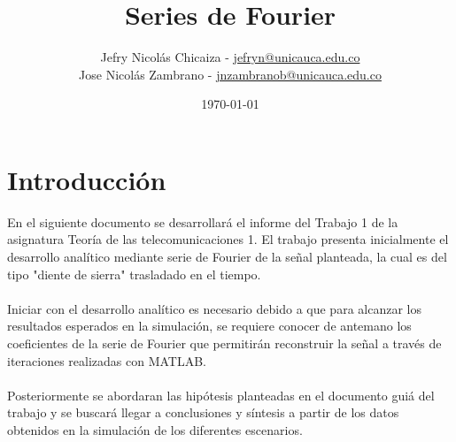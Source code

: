 \documentclass[12pt]{article}
\date{\today}.
\title{\textbf{Series de Fourier}}
\author{
    Jefry Nicolás Chicaiza - \url{jefryn@unicauca.edu.co}\\
    Jose Nicolás Zambrano - \url{jnzambranob@unicauca.edu.co}
}
\date{}
\begin{document}
\maketitle
\thispagestyle{fancy}
\section*{Introducción}
    En el siguiente documento se desarrollará el informe del Trabajo 1 de la asignatura 
    Teoría de las telecomunicaciones 1. El trabajo presenta inicialmente el desarrollo 
    analítico mediante serie de Fourier de la señal planteada, la cual es del tipo 
    "diente de sierra" trasladado en el tiempo.\\
    \\
    Iniciar con el desarrollo analítico es necesario debido a que para alcanzar los 
    resultados esperados en la simulación, se requiere conocer de antemano los coeficientes 
    de la serie de Fourier que permitirán reconstruir la señal a través de iteraciones 
    realizadas con MATLAB.\\
    \\
    Posteriormente se abordaran las hipótesis planteadas en el documento guiá del trabajo 
    y se buscará llegar a conclusiones y síntesis a partir de los datos obtenidos en la 
    simulación de los diferentes escenarios.\\
\end{document}
